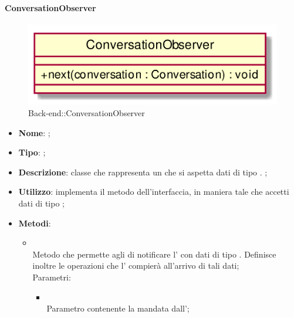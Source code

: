 \hypertarget{ConversationObserver_label}{\paragraph{ConversationObserver}}
\begin{figure}[h]
	\centering
	\includegraphics[width=\textwidth,height=\textheight,keepaspectratio]{images/ClassConversationObserver.png}
	\caption{Back-end::ConversationObserver}
\end{figure}
\begin{itemize}
	\item \textbf{Nome}: ;
	\item \textbf{Tipo}: ;
	\item \textbf{Descrizione}: classe che rappresenta un  che si aspetta dati di tipo . ;
	\item \textbf{Utilizzo}: implementa il metodo  dell'interfaccia, in maniera tale che accetti dati di tipo ;
	\item \textbf{Metodi}:
	\begin{itemize}
		\item[]  \\
		Metodo che permette agli  di notificare l' con dati di tipo . Definisce inoltre le operazioni che l' compierà all'arrivo di tali dati;\\
		Parametri:
		\begin{itemize}
			\item {} \\
			Parametro contenente la  mandata dall';
		\end{itemize}
	\end{itemize}
\end{itemize}
\FloatBarrier

